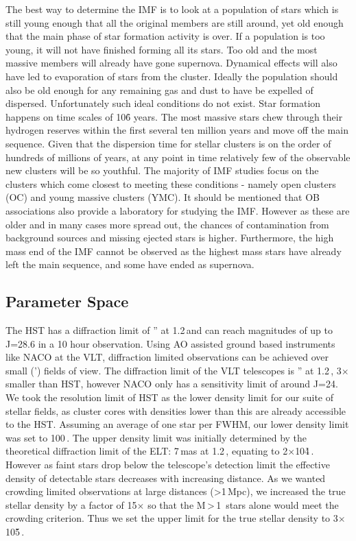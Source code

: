 The best way to determine the IMF is to look at a population of stars which
is  still young enough that all the original members are still around, yet
old  enough that the main phase of star formation activity is over. If a
population is too young, it will not have finished forming all its stars. Too
old and the most massive members will already have gone supernova. Dynamical
effects will also have led to evaporation of stars from the cluster. Ideally
the population should also be old enough for any remaining gas and dust to
have  be expelled of dispersed. Unfortunately such ideal conditions do not
exist. Star formation happens on time scales of 10\h6 years. The most massive
stars chew through their hydrogen reserves within the first several ten
million  years and move off the main sequence. Given that the dispersion time
for stellar clusters is on the order of hundreds of millions of years, at any
point in time relatively few of the observable new clusters will be so
youthful.  The majority of IMF studies focus on the clusters which come
closest  to meeting these conditions - namely open clusters (OC) and young
massive clusters (YMC). It should be mentioned that OB associations also
provide  a laboratory for studying the IMF. However as these are older and in
many cases more spread out, the chances of contamination from background
sources  and missing ejected stars is higher. Furthermore, the high mass end
of  the IMF cannot be observed as the highest mass stars have already left
the  main sequence, and some have ended as supernova.


\subsection{Parameter Space}

The HST has a diffraction limit of '' at 1.2\,\um and can reach
magnitudes  of up to J=28.6\m \citep{hst_wfc3} in a 10 hour observation.
Using  AO assisted ground based instruments like NACO at the VLT, diffraction
limited observations can be achieved over small (') fields of view. The
diffraction limit of the VLT telescopes is '' at 1.2\,\um, 3$\times$
smaller  than HST, however NACO only has a sensitivity limit of around J=24\m.
We took the resolution limit of HST as the lower density limit for our
suite of stellar fields, as cluster cores with densities lower than this are
already accessible to the HST. Assuming an average of one star per FWHM, our
lower density limit was set to 100\,\spa. The upper density limit was
initially determined by the theoretical diffraction limit of the ELT:
7\,mas at 1.2\,\ume, equating to 2$\times$10\h4\,\spa.
However as faint stars drop below
the telescope's detection  limit the effective density of detectable stars
decreases with increasing distance. As we wanted crowding limited
observations  at large distances (\textgreater1\,Mpc), we increased the true
stellar density by a factor of 15$\times$ so that the M\,\textgreater\,1\,
\msun stars  alone would meet  the crowding criterion. Thus we set the upper
limit for the true stellar  density to 3$\times$10\h5\,\spa.

